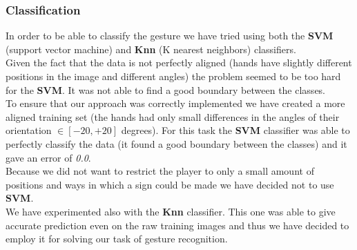 \documentclass[a4paper, 11pt, twocolumn]{article}
\begin{document}
		\subsubsection{Classification}
		In order to be able to classify the gesture we have tried using both the \textbf{SVM} (support vector machine) and \textbf{Knn} (K nearest neighbors) classifiers.\\
		\hspace*{10px}Given the fact that the data is not perfectly aligned (hands have slightly different positions in the image and different angles) the problem seemed to be too hard for the \textbf{SVM}. It was not able to find a good boundary between the classes.\\
		\hspace*{10px}To ensure that our approach was correctly implemented we have created a more aligned training set (the hands had only small differences in the angles of their orientation $ \in [-20, +20]$ degrees). For this task the \textbf{SVM} classifier was able to perfectly classify the data (it found a good boundary between the classes) and it gave an error of \emph{0.0}.\\
		\hspace*{10px}Because we did not want to restrict the player to only a small amount of positions and ways in which a sign could be made we have decided not to use \textbf{SVM}.\\
		\hspace*{10px}We have experimented also with the \textbf{Knn} classifier. This one was able to give accurate prediction even on the raw training images and thus we have decided to employ it for solving our task of gesture recognition.
\end{document}
